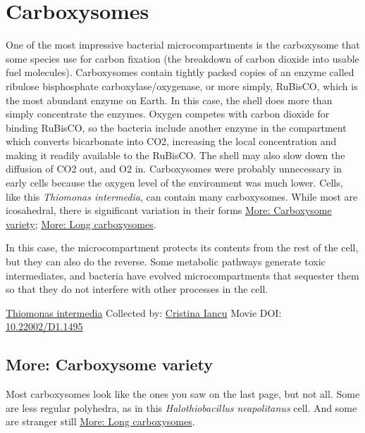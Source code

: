 \documentclass[]{tufte-book}
\begin{document}
\hypertarget{carboxysomes}{%
\section{Carboxysomes}\label{carboxysomes}}

One of the most impressive bacterial microcompartments is the carboxysome that some species use for carbon fixation (the breakdown of carbon dioxide into usable fuel molecules). Carboxysomes contain tightly packed copies of an enzyme called ribulose bisphosphate carboxylase/oxygenase, or more simply, RuBisCO, which is the most abundant enzyme on Earth. In this case, the shell does more than simply concentrate the enzymes. Oxygen competes with carbon dioxide for binding RuBisCO, so the bacteria include another enzyme in the compartment which converts bicarbonate into CO2, increasing the local concentration and making it readily available to the RuBisCO. The shell may also slow down the diffusion of CO2 out, and O2 in. Carboxysomes were probably unnecessary in early cells because the oxygen level of the environment was much lower. Cells, like this \emph{Thiomonas intermedia}, can contain many carboxysomes. While most are icosahedral, there is significant variation in their forms \protect\hyperlink{Carboxysome_variety}{More: Carboxysome variety}; \protect\hyperlink{Long_carboxysomes}{More: Long carboxysomes}.

In this case, the microcompartment protects its contents from the rest of the cell, but they can also do the reverse. Some metabolic pathways generate toxic intermediates, and bacteria have evolved microcompartments that sequester them so that they do not interfere with other processes in the cell.



\hypertarget{htmlwidget-3a834efe5794f477a18e}{}

\label{fig:4-7}\protect\hyperlink{tree}{Thiomonas intermedia} Collected by: \protect\hyperlink{cristina_iancu}{Cristina Iancu} Movie DOI: \href{https://doi.org/10.22002/D1.1495}{10.22002/D1.1495}

\hypertarget{Carboxysome_variety}{%
\subsection*{More: Carboxysome variety}\label{Carboxysome_variety}}

Most carboxysomes look like the ones you saw on the last page, but not all. Some are less regular polyhedra, as in this \emph{Halothiobacillus neapolitanus} cell. And some are stranger still \protect\hyperlink{Long_carboxysomes}{More: Long carboxysomes}.
\end{document}

